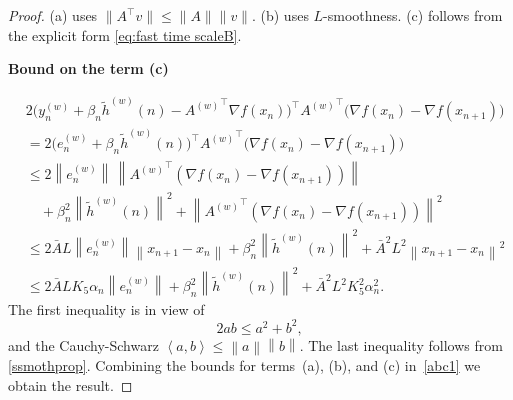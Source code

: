 \documentclass{article}
\newcommand{\norm}[1]{\left\lVert #1 \right\rVert}
\newcommand{\inprod}[2]{\left\langle #1, #2 \right\rangle}
\begin{document}
\begin{proof}
(a) uses $\|A^\top v\|\le \|A\|\|v\|$. 
(b) uses $L$-smoothness. 
(c) follows from the explicit form \eqref{eq:fast time scaleB}.

\textbf{Bound on the term (c)}

\begin{equation*}
\begin{split}
& 2\big(y_n^{(w)} + \beta_n \widetilde{h}^{(w)}(n) - {A^{(w)}}^\top \nabla f(x_n)\big)^\top
{A^{(w)}}^\top\big(\nabla f(x_n) - \nabla f(x_{n+1})\big) \\
&= 2\big(e_n^{(w)} + \beta_n \widetilde{h}^{(w)}(n)\big)^\top
{A^{(w)}}^\top\big(\nabla f(x_n) - \nabla f(x_{n+1})\big) \\
&\le 
2 \norm{e_n^{(w)}} \,
\norm{{A^{(w)}}^\top(\nabla f(x_n)-\nabla f(x_{n+1}))} \\
&\quad +
\beta_n^2 \norm{\widetilde{h}^{(w)}(n)}^2
+ \norm{{A^{(w)}}^\top(\nabla f(x_n)-\nabla f(x_{n+1}))}^2 \\
&\le 
2 \bar{A} L \norm{e_n^{(w)}} \norm{x_{n+1}-x_n}
+ \beta_n^2 \norm{\widetilde{h}^{(w)}(n)}^2
+ \bar{A}^2 L^2 \norm{x_{n+1}-x_n}^2 \\
&\le 
2 \bar{A} L K_5 \alpha_n \norm{e_n^{(w)}}
+ \beta_n^2 \norm{\widetilde{h}^{(w)}(n)}^2
+ \bar{A}^2 L^2 K_5^2 \alpha_n^2.
\end{split}
\end{equation*}
The first inequality is in view of \[ 2 a b  \leq  a^2 + b^2,
\] and the Cauchy-Schwarz $\inprod{a}{b} \leq \norm{a}\norm{b}$. The last inequality follows from \eqref{ssmothprop}. Combining the bounds for terms~(a), (b), and (c) in~\eqref{abc1} we obtain the result. 
\end{proof}
\end{document}
